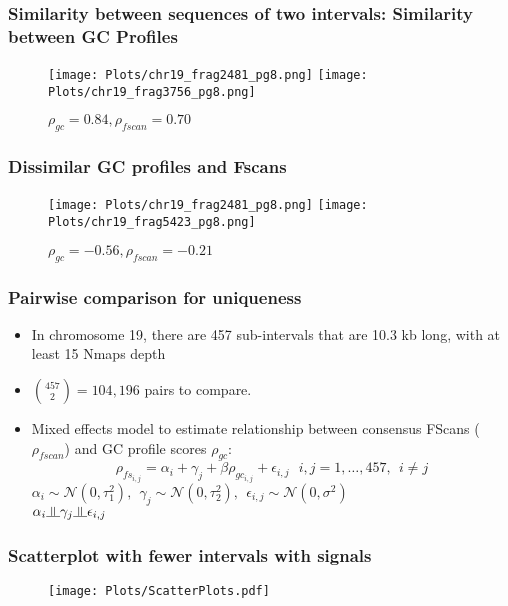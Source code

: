\documentclass[10pt,dvipsnames,table]{beamer}
\begin{document}
\begin{frame}
\frametitle{Similarity between sequences of two intervals: Similarity between GC Profiles}
\begin{figure}
\centering
\texttt{[image: Plots/chr19\_frag2481\_pg8.png]}
\texttt{[image: Plots/chr19\_frag3756\_pg8.png]}
\caption{$\rho_{gc} = 0.84, \rho_{fscan} = 0.70$}
\end{figure}
\end{frame}

\begin{frame}
\frametitle{Dissimilar GC profiles and Fscans}
\begin{figure}
\centering
\texttt{[image: Plots/chr19\_frag2481\_pg8.png]}
\texttt{[image: Plots/chr19\_frag5423\_pg8.png]}
\caption{$\rho_{gc} = -0.56, \rho_{fscan} = -0.21$}
\end{figure}

\end{frame}

\begin{frame}
\frametitle{Pairwise comparison for uniqueness}
\begin{itemize}
\item In chromosome 19, there are 457 sub-intervals that are 10.3 kb long, with at least 15 Nmaps depth
\item $ \binom {457} {2} = 104,196 $ pairs to compare. 
\item Mixed effects model to estimate relationship between consensus FScans ($\rho_{fscan}$) and GC profile scores $\rho_{gc}$:
\[ 
\rho_{fs_{i,j}} = \alpha_i + \gamma_j + \beta \rho_{gc_{i,j}} + \epsilon_{i,j}\ \ \ i, j = 1, \dots, 457,\ \ i \ne j
\]
$\alpha_i \sim \mathcal{N}(0, \tau_1^2), \ \ \gamma_j \sim \mathcal{N}(0, \tau_2^2), \ \ \epsilon_{i,j} \sim \mathcal{N}(0, \sigma^2)$ \\
$ \alpha_i \indep \gamma_j \indep \epsilon_{i,j}$
\end{itemize}

\end{frame}

\begin{frame}
\frametitle{Scatterplot with fewer intervals with signals}
\begin{figure}
\centering
\texttt{[image: Plots/ScatterPlots.pdf]}
\end{figure}

\end{frame}
\end{document}
